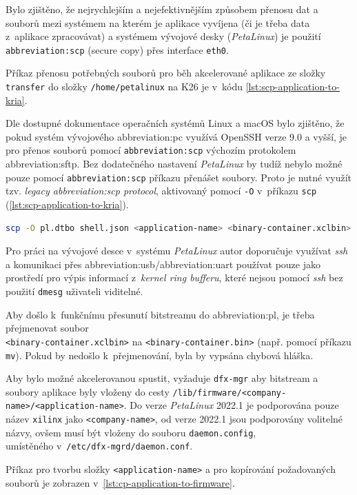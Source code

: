 \documentclass[a4paper, twoside, 11pt]{article}
\begin{document}
	Bylo zjištěno, že nejrychlejším a nejefektivnějším způsobem přenosu dat a souborů mezi systémem na kterém je aplikace vyvíjena (či je třeba data z~aplikace zpracovávat) a systémem vývojové desky (\textit{PetaLinux}) je použití \texttt{\gls{abbreviation:scp}} (secure copy) přes interface \texttt{eth0}.\par
	Příkaz přenosu potřebných souborů pro běh akcelerované aplikace ze složky \texttt{transfer} do složky \texttt{/home/petalinux} na K26 je v~kódu \ref{lst:scp-application-to-kria}.\par
	Dle dostupné dokumentace operačních systémů Linux a macOS bylo zjištěno, že pokud systém vývojového \gls{abbreviation:pc} využívá OpenSSH verze 9.0 a vyšší, je pro přenos souborů pomocí \texttt{\gls{abbreviation:scp}} výchozím protokolem \gls{abbreviation:sftp}. Bez dodatečného nastavení \textit{PetaLinux} by tudíž nebylo možné pouze pomocí \texttt{\gls{abbreviation:scp}} příkazu přenášet soubory. Proto je nutné využít tzv. \textit{legacy \gls{abbreviation:scp} protocol}, aktivovaný pomocí \texttt{-O} v~příkazu \texttt{scp} (\ref{lst:scp-application-to-kria}).\par

	\begin{lstlisting}[language={sh}, caption={Příkaz pro přesun souborů pomocí \gls{abbreviation:scp} ze systému, kde byla aplikace vyvíjena do systému PetaLinux na K26 SOM.}, label={lst:scp-application-to-kria}, morekeywords={scp}]
scp -O pl.dtbo shell.json <application-name> <binary-container.xclbin> root@<ip-address-of-eth-interface>:/home/petalinux
\end{lstlisting}

	Pro práci na vývojové desce v~systému \textit{PetaLinux} autor doporučuje využívat \textit{ssh} a komunikaci přes \gls{abbreviation:usb}/\gls{abbreviation:uart} používat pouze jako prostředí pro výpis informací z~\textit{kernel ring bufferu}, které nejsou pomocí \textit{ssh} bez použití \texttt{dmesg} uživateli viditelné.\par
	Aby došlo k~funkčnímu přesunutí bitstreamu do \gls{abbreviation:pl}, je třeba přejmenovat soubor\\\texttt{<binary-container.xclbin>} na \texttt{<binary-container.bin>} (např. pomocí příkazu \texttt{mv}). Pokud by nedošlo k~přejmenování, byla by vypsána chybová hláška.\par
	Aby bylo možné akcelerovanou spustit, vyžaduje \texttt{dfx-mgr} aby bitstream a soubory aplikace byly vloženy do cesty \texttt{/lib/firmware/<company-name>/<application-name>}. Do verze \textit{PetaLinux} 2022.1 je podporována pouze název \texttt{xilinx} jako \texttt{<company-name>}, od verze 2022.1 jsou podporovány volitelné názvy, ovšem musí být vloženy do souboru \texttt{daemon.config},\\umístěného v~\texttt{/etc/dfx-mgrd/daemon.conf}. \cite{xilinx-github-vitis-tutorials-step-2-create-the-software-components} \cite{xilinx-github-dfx-mgr}\par
	Příkaz pro tvorbu složky \texttt{<application-name>} a pro kopírování požadovaných souborů je zobrazen v~\ref{lst:cp-application-to-firmware}.\par
\end{document}
